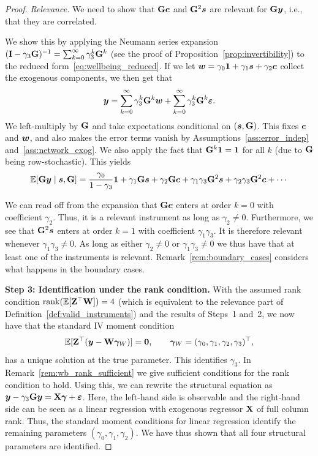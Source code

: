 \begin{proof}
\emph{Relevance.} We need to show that $\mathbf{G}\bm{c}$ and $\mathbf{G}^2\bm{s}$ are relevant for $\mathbf{G}\bm{y}$, i.e., that they are correlated. 

We show this by applying the Neumann series expansion $(\mathbf{I} - \gamma_3\mathbf{G})^{-1} = \sum_{k=0}^{\infty}\gamma_3^k\mathbf{G}^k$ (see the proof of Proposition~\ref{prop:invertibility}) to the reduced form~\eqref{eq:wellbeing_reduced}. If we let $\bm{w} = \gamma_0\bm{1} + \gamma_1\bm{s} + \gamma_2\bm{c}$ collect the exogenous components, we then get that
\[
    \bm{y} = \sum_{k=0}^{\infty}\gamma_3^k\mathbf{G}^k\bm{w} + \sum_{k=0}^{\infty}\gamma_3^k\mathbf{G}^k\bm{\varepsilon}.
\]
We left-multiply by $\mathbf{G}$ and take expectations conditional on $(\bm{s}, \mathbf{G})$. This fixes $\bm{c}$ and $\bm{w}$, and also makes the error terms vanish by Assumptions~\ref{ass:error_indep} and~\ref{ass:network_exog}. We also apply the fact that $\mathbf{G}^k\bm{1} = \bm{1}$ for all $k$ (due to $\mathbf{G}$ being row-stochastic). This yields
\begin{equation}
\label{eq:Gy_conditional}
    \mathbb{E}[\mathbf{G}\bm{y} \mid \bm{s}, \mathbf{G}]
    = \frac{\gamma_0}{1-\gamma_3}\bm{1}
    + \gamma_1\mathbf{G}\bm{s}
    + \gamma_2\mathbf{G}\bm{c}
    + \gamma_1\gamma_3\mathbf{G}^2\bm{s}
    + \gamma_2\gamma_3\mathbf{G}^2\bm{c}
    + \cdots
\end{equation}

We can read off from the expansion that $\mathbf{G}\bm{c}$ enters at order $k = 0$ with coefficient $\gamma_2$. Thus, it is a relevant instrument as long as $\gamma_2 \neq 0$. Furthermore, we see that $\mathbf{G}^2\bm{s}$ enters at order $k = 1$ with coefficient $\gamma_1\gamma_3$. It is therefore relevant whenever $\gamma_1\gamma_3 \neq 0$. As long as either $\gamma_2 \neq 0$ or $\gamma_1\gamma_3 \neq 0$ we thus have that at least one of the instruments is relevant. Remark~\ref{rem:boundary_cases} considers what happens in the boundary cases.

\textbf{Step 3: Identification under the rank condition.}
With the assumed rank condition $\operatorname{rank}(\mathbb{E}[\mathbf{Z}^\top\mathbf{W}]) = 4$ (which is equivalent to the relevance part of Definition~\ref{def:valid_instruments}) and the results of Steps~1 and~2, we now have that the standard IV moment condition \parencite[Eq.~(4.2.2), p.~141]{Angrist2009}
\[
    \mathbb{E}[\mathbf{Z}^\top(\bm{y} - \mathbf{W}\bm{\gamma}_W)] = \bm{0},
    \qquad \bm{\gamma}_W = (\gamma_0, \gamma_1, \gamma_2, \gamma_3)^\top,
\]
has a unique solution at the true parameter. This identifies $\gamma_3$. In Remark~\ref{rem:wb_rank_sufficient} we give sufficient conditions for the rank condition to hold. Using this, we can rewrite the structural equation as $\bm{y} - \gamma_3\mathbf{G}\bm{y} = \mathbf{X}\bm{\gamma} + \bm{\varepsilon}$. Here, the left-hand side is observable and the right-hand side can be seen as a linear regression with exogenous regressor $\mathbf{X}$ of full column rank. Thus, the standard moment conditions for linear regression identify the remaining parameters $(\gamma_0, \gamma_1, \gamma_2)$. We have thus shown that all four structural parameters are identified.
\end{proof}

